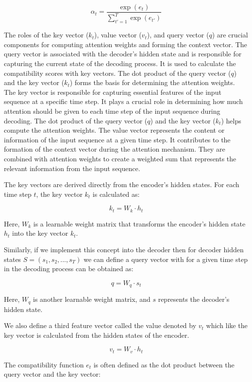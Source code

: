 \documentclass{report}
\begin{document}
\[ \alpha_t = \frac{\exp(e_t)}{\sum_{t'=1}^{T} \exp(e_{t'})} \]

The roles of the key vector (\(k_t\)), value vector (\(v_t\)), and query vector (\(q\)) are crucial components for computing attention weights and forming the context vector. The query vector is associated with the decoder's hidden state and is responsible for capturing the current state of the decoding process. It is used to calculate the compatibility scores with key vectors. The dot product of the query vector (\(q\)) and the key vector (\(k_t\)) forms the basis for determining the attention weights. The key vector is responsible for capturing essential features of the input sequence at a specific time step. It plays a crucial role in determining how much attention should be given to each time step of the input sequence during decoding. The dot product of the query vector (\(q\)) and the key vector (\(k_t\)) helps compute the attention weights. The value vector represents the content or information of the input sequence at a given time step. It contributes to the formation of the context vector during the attention mechanism. They are combined with attention weights to create a weighted sum that represents the relevant information from the input sequence.

The key vectors are derived directly from the encoder's hidden states. For each time step \(t\), the key vector \(k_t\) is calculated as:

\[ k_t = W_k \cdot h_t \]

Here, \(W_k\) is a learnable weight matrix that transforms the encoder's hidden state \(h_t\) into the key vector \(k_t\).

Similarly, if we implement this concept into the decoder then for decoder hidden states \(S = (s_1, s_2, ..., s_T)\) we can define a query vector with for a given time step in the decoding process can be obtained as: 

\[ q = W_q \cdot s_t \]

Here, \(W_q\) is another learnable weight matrix, and \(s\) represents the decoder's hidden state.

We also define a third feature vector called the value denoted by $v_t$ which like the key vector is calculated from the hidden states of the encoder.

$$v_t = W_v \cdot h_t$$

The compatibility function \(e_t\) is often defined as the dot product between the query vector and the key vector:
\end{document}
